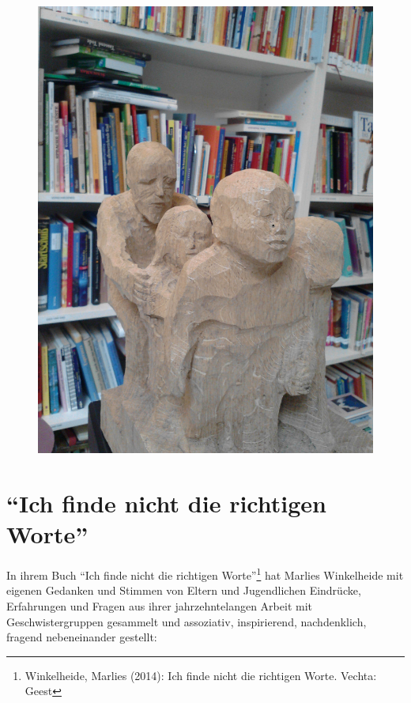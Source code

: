 \documentclass[a4paper,
fontsize=11pt,
oneside,
numbers=noperiodatend,
parskip=half-,
bibliography=totoc,
final
]{scrartcl}
\begin{document}
\begin{figure}
\centering
\includegraphics{img/abbildung1.jpg}
\end{figure}

\section*{\texorpdfstring{\enquote{Ich finde nicht die richtigen
Worte}}{Ich finde nicht die richtigen Worte}}\label{ich-finde-nicht-die-richtigen-worte}

In ihrem Buch \enquote{Ich finde nicht die richtigen Worte}\footnote{Winkelheide,
  Marlies (2014): Ich finde nicht die richtigen Worte. Vechta: Geest}
hat Marlies Winkelheide mit eigenen Gedanken und Stimmen von Eltern und
Jugendlichen Eindrücke, Erfahrungen und Fragen aus ihrer
jahrzehntelangen Arbeit mit Geschwistergruppen gesammelt und assoziativ,
inspirierend, nachdenklich, fragend nebeneinander gestellt:
\end{document}
